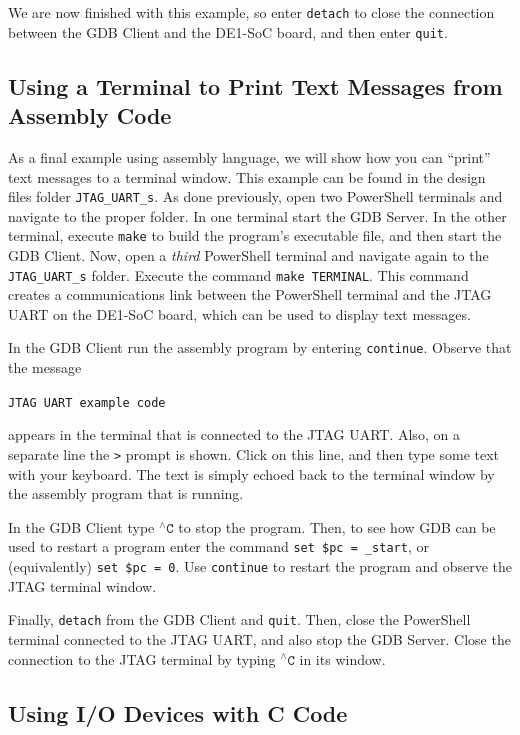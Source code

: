\documentclass[11pt, twoside, pdftex]{article}
\begin{document}
We are now finished with this example, so enter \texttt{detach} to close the connection between 
the GDB Client and the DE1-SoC board, and then enter \texttt{quit}.

\subsection{Using a Terminal to Print Text Messages from Assembly Code}

As a final example using assembly language, we will show how you can ``print'' text messages 
to a terminal window.  This example can be found in the design files folder 
\texttt{JTAG\_UART\_s}. As done previously, open two PowerShell terminals and navigate to
the proper folder. In one terminal
start the GDB Server. In the other terminal, execute \texttt{make} to build the program's
executable file, and then start the GDB Client. Now, open a {\it third} PowerShell
terminal and navigate again to the \texttt{JTAG\_UART\_s} folder. Execute the command 
\texttt{make TERMINAL}. This command creates a communications link between the PowerShell
terminal and the JTAG UART on the DE1-SoC board, which can be used to display text
messages. 

In the GDB Client run the assembly program by entering \texttt{continue}. Observe that the
message 

\texttt{JTAG UART example code}

appears in the terminal that is connected to the
JTAG UART. Also, on a separate line the \texttt{>} prompt is shown. Click on this line,
and then type some text with your keyboard. The text is simply echoed back to the terminal
window by the assembly program that is running. 

In the GDB Client type $^{\wedge}\texttt{C}$ to stop the program. Then, to see how GDB can
be used to restart a program enter the command \texttt{set \$pc = \_start}, or
(equivalently) \texttt{set \$pc = 0}. Use \texttt{continue} to restart the program and 
observe the JTAG terminal window. 

Finally, \texttt{detach} from the GDB Client and \texttt{quit}. Then, close the PowerShell
terminal connected to the JTAG UART, and also stop the GDB Server.
Close the connection to the JTAG terminal by typing $^{\wedge}\texttt{C}$ in its window.

\subsection{Using I/O Devices with C Code}
\end{document}
